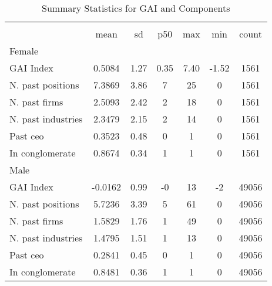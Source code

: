 \begin{table}[htbp]\centering
\def\sym#1{\ifmmode^{#1}\else\(^{#1}\)\fi}
\caption{Summary Statistics for GAI and Components}
\begin{tabular}{l*{1}{cccccc}}
\hline\hline
                    &\multicolumn{6}{c}{}                                                         \\
                    &        mean&          sd&         p50&         max&         min&       count\\
\hline
Female              &            &            &            &            &            &            \\
GAI Index           &      0.5084&        1.27&        0.35&        7.40&       -1.52&        1561\\
N. past positions   &      7.3869&        3.86&           7&          25&           0&        1561\\
N. past firms       &      2.5093&        2.42&           2&          18&           0&        1561\\
N. past industries  &      2.3479&        2.15&           2&          14&           0&        1561\\
Past ceo            &      0.3523&        0.48&           0&           1&           0&        1561\\
In conglomerate     &      0.8674&        0.34&           1&           1&           0&        1561\\
\hline
Male                &            &            &            &            &            &            \\
GAI Index           &     -0.0162&        0.99&          -0&          13&          -2&       49056\\
N. past positions   &      5.7236&        3.39&           5&          61&           0&       49056\\
N. past firms       &      1.5829&        1.76&           1&          49&           0&       49056\\
N. past industries  &      1.4795&        1.51&           1&          13&           0&       49056\\
Past ceo            &      0.2841&        0.45&           0&           1&           0&       49056\\
In conglomerate     &      0.8481&        0.36&           1&           1&           0&       49056\\
\hline\hline
\end{tabular}
\end{table}
